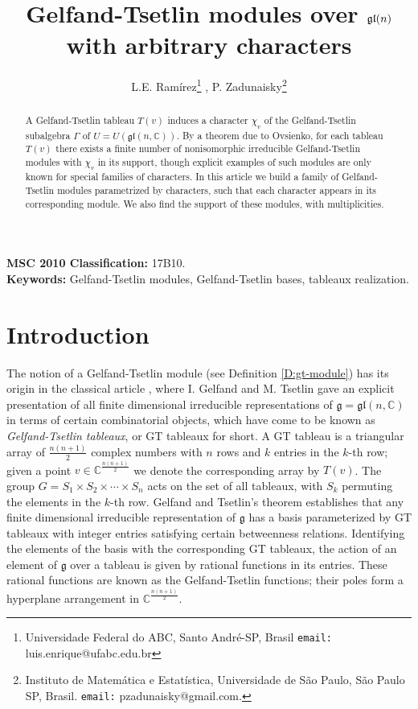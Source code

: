 \documentclass[11pt,fleqn]{article}
\title{Gelfand-Tsetlin modules over $\gl(n)$ with arbitrary characters}
\author{L.E. Ram\'irez\footnote{Universidade Federal do ABC, Santo Andr\'e-SP, 
Brasil \texttt{email:} luis.enrique@ufabc.edu.br} , 
P. Zadunaisky\footnote{Instituto de Matem\'atica e Estat\'istica, Universidade 
de S\~ao Paulo,  S\~ao Paulo SP, Brasil. \texttt{email:} pzadunaisky@gmail.com.
}
}
\newcommand\CC{\mathbb C}
\newcommand\g{\mathfrak g}
\newcommand\gl{\mathfrak{gl}}
\begin{document}
\maketitle

\begin{abstract}
A Gelfand-Tsetlin tableau $T(v)$ induces a character $\chi_v$ of the 
Gelfand-Tsetlin subalgebra $\Gamma$ of $U = U(\gl(n,\CC))$. By a theorem due 
to Ovsienko, for each tableau $T(v)$ there exists a finite number of 
nonisomorphic irreducible Gelfand-Tsetlin modules with $\chi_v$ in its 
support, though explicit examples of such modules are only known for special
families of characters. In this article we build a family of Gelfand-Tsetlin
modules parametrized by characters, such that each character appears in its
corresponding module. We also find the support of these modules, with 
multiplicities.
\end{abstract}
\noindent\textbf{MSC 2010 Classification:} 17B10.\\
\noindent\textbf{Keywords:} Gelfand-Tsetlin modules, Gelfand-Tsetlin bases,
tableaux realization.

\section{Introduction}
The notion of a Gelfand-Tsetlin module (see Definition \ref{D:gt-module}) has 
its origin in the classical article \cite{GT-modules}, where I. Gelfand and M. 
Tsetlin gave an explicit presentation of all finite dimensional irreducible 
representations of $\g = \gl(n,\CC)$ in terms of certain combinatorial 
objects, which have come to be known as \emph{Gelfand-Tsetlin tableaux}, or 
GT tableaux for short. A GT tableau is a triangular array of $\frac{n(n+1)}{2}$
complex numbers with $n$ rows and $k$ entries in the $k$-th row; given a point 
$v \in \CC^{\frac{n(n+1)}{2}}$ we denote the corresponding array by $T(v)$. 
The group 
$G = S_1 \times S_2 \times \cdots \times S_n$ acts on the set of all tableaux, 
with $S_k$ permuting the elements in the $k$-th row. Gelfand and Tsetlin's
theorem establishes that any finite dimensional irreducible representation of 
$\g$ has a basis parameterized by GT tableaux with integer entries satisfying 
certain betweenness relations. Identifying the elements of the basis with the 
corresponding GT tableaux, the action of an element of $\g$ over a 
tableau is given by rational functions in its entries. These rational 
functions are known as the Gelfand-Tsetlin functions; their poles form a 
hyperplane arrangement in $\CC^{\frac{n(n+1)}{2}}$.
\end{document}
